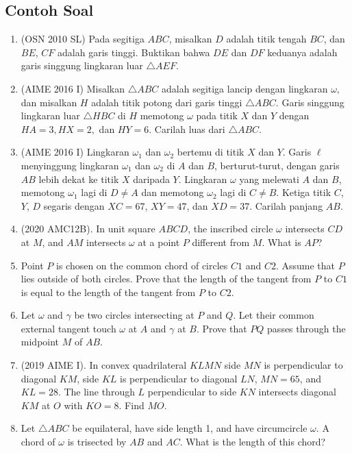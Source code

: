 \documentclass[11pt]{scrartcl}
\begin{document}
\subsection{Contoh Soal}
\begin{enumerate}
    \item (OSN 2010 SL) Pada segitiga $ABC$, misalkan $D$ adalah titik tengah $BC$, dan $BE$, $CF$ adalah garis tinggi. Buktikan bahwa $DE$ dan $DF$ keduanya adalah garis singgung lingkaran luar $\triangle AEF$. %

    \item (AIME 2016 I) Misalkan $\triangle ABC$ adalah segitiga lancip dengan lingkaran $\omega,$ dan misalkan $H$ adalah titik potong dari garis tinggi $\triangle ABC.$ Garis singgung lingkaran luar $\triangle HBC$ di $H$ memotong $\omega$ pada titik $X$ dan $Y$ dengan $HA=3,HX=2,$ dan $HY=6.$ Carilah luas dari $\triangle ABC$.

    \item (AIME 2016 I) Lingkaran $\omega_1$ dan $\omega_2$ bertemu di titik $X$ dan $Y$. Garis $\ell$ menyinggung lingkaran $\omega_1$ dan $\omega_2$ di $A$ dan $B$, berturut-turut, dengan garis $AB$ lebih dekat ke titik $X$ daripada $Y$. Lingkaran $\omega$ yang melewati $A$ dan $B$, memotong $\omega_1$ lagi di $D \neq A$ dan memotong $\omega_2$ lagi di $C \neq B$. Ketiga titik $C$, $Y$, $D$ segaris dengan $XC = 67$, $XY = 47$, dan $XD = 37$. Carilah panjang $AB$.
    
    \item (2020 AMC12B). In unit square $ABCD$, the inscribed circle $\omega$ intersects $CD$ at $M$, and $AM$ intersects $\omega$ at a point $P$ different from $M$. What is $AP$?
\item Point $P$ is chosen on the common chord of circles $C1$ and $C2$. Assume that $P$ lies outside of both circles. Prove that the length of the tangent from $P$ to $C1$ is equal to the length of the tangent from $P$ to $C2$.
\item Let $\omega$ and $\gamma$ be two circles intersecting at $P$ and $Q$. Let their common external tangent touch $\omega$ at $A$ and $\gamma$ at $B$. Prove that $PQ$ passes through the midpoint $M$ of $AB$.
\item (2019 AIME I). In convex quadrilateral $KLMN$ side $MN$ is perpendicular to diagonal $KM$, side $KL$ is perpendicular to diagonal $LN$, $MN = 65$, and $KL = 28$. The line through $L$ perpendicular to side $KN$ intersects diagonal $KM$ at $O$ with $KO = 8$. Find $MO$.
\item Let $\triangle ABC$ be equilateral, have side length 1, and have circumcircle $\omega$. A chord of $\omega$ is trisected by $AB$ and $AC$. What is the length of this chord?
 \end{enumerate}
\end{document}

